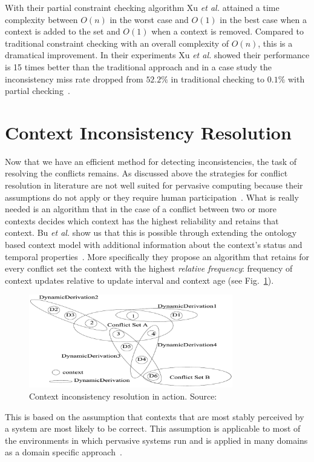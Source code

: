\documentclass[journal]{vgtc}                %
\begin{document}
With their partial constraint checking algorithm Xu \textit{et al.} attained a time complexity between $O(n)$ in the worst case and $O(1)$ in the best case when a context is added to the set and $O(1)$ when a context is removed. Compared to traditional constraint checking with an overall complexity of $O(n)$, this is a dramatical improvement. In their experiments Xu \textit{et al.} showed their performance is 15 times better than the traditional approach and in a case study the inconsistency miss rate dropped from $52.2\%$ in traditional checking to $0.1\%$ with partial checking~\cite{xu:2010:PCC}.

\section{Context Inconsistency Resolution}
Now that we have an efficient method for detecting inconsistencies, the task of resolving the conflicts remains. As discussed above the strategies for conflict resolution in literature are not well suited for pervasive computing because their assumptions do not apply or they require human participation~\cite{xu:2010:PCC}. What is really needed is an algorithm that in the case of a conflict between two or more contexts decides which context has the highest reliability and retains that context. Bu \textit{et al.} show us that this is possible through extending the ontology based context model with additional information about the context's status and temporal properties~\cite{bu:2006:CCM}. More specifically they propose an algorithm that retains for every conflict set the context with the highest \textit{relative frequency}: frequency of context updates relative to update interval and context age (see Fig.~\ref{fig:cir}). 
\begin{figure}[htb]
  \centering
  \includegraphics[width=3.5in]{cir}
  \caption{Context inconsistency resolution in action. Source:~\cite{bu:2006:CCM}}
  \label{fig:cir}
\end{figure}
This is based on the assumption that contexts that are most stably perceived by a system are most likely to be correct. This assumption is applicable to most of the environments in which pervasive systems run and is applied in many domains as a domain specific approach~\cite{xu:2010:PCC}.
\end{document}
